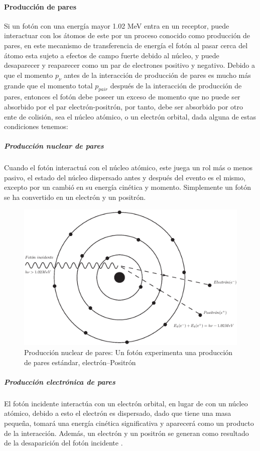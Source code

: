 \paragraph{Producción de pares}
Si un fotón con una energía mayor  1.02 MeV entra en un receptor, puede interactuar con los átomos de este por un proceso conocido como producción de pares, en este mecanismo de transferencia de energía el fotón al pasar cerca del átomo esta sujeto a efectos de campo fuerte debido al núcleo, y puede desaparecer y reaparecer como un par de electrones positivo y negativo.\cite{Edward}
Debido a que el momento $p_\nu$ antes de la interacción de producción de pares es mucho más grande que el momento total  $p_{pair}$ después de la interacción de producción de pares,  entonces el fotón debe poseer un exceso de momento que no puede ser absorbido por el par electrón-positrón, por tanto, debe ser absorbido por otro ente de colisión, sea el núcleo atómico, o un electrón orbital\cite{Podgorsak}, dada alguna de estas condiciones tenemos:
\subparagraph{Producción nuclear de pares}
 Cuando el fotón interactuá con el núcleo atómico, este juega un rol más o menos pasivo, el estado del núcleo dispersado antes y después del evento es el mismo, excepto por un cambió en su energía cinética y momento. Simplemente un fotón se ha convertido en un electrón y un positrón\cite{Edward}.
\begin{figure}[htbp]
    \centering
    \includegraphics[width=.71\linewidth]{./Figures/nuclearpp.eps}
    \caption[Producción nuclear de pares]{Producción nuclear de pares: Un fotón experimenta una producción de pares estándar, electrón--Positrón}
    \label{fig:PN}
\end{figure}
\subparagraph{Producción electrónica de pares}
 El fotón incidente interactúa con un electrón orbital, en lugar de con un núcleo atómico, debido a esto el electrón es dispersado, dado que tiene una masa pequeña, tomará una energía cinética significativa y aparecerá como un producto de la interacción. Además, un electrón y un positrón se generan como resultado de la desaparición del fotón incidente \cite{Edward}.
